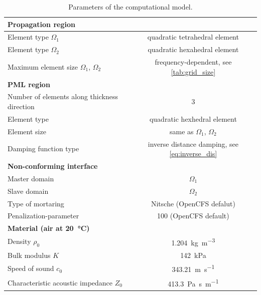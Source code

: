 {\begin{table}
	\centering
	\caption{Parameters of the computational model.}
	\label{tab:model_parameters}
	\begin{tabular}{lc}
		\toprule
		\textbf{Propagation region} & \\
        \midrule
		Element type $\Omega_1$ & quadratic tetrahedral element \\
		Element type $\Omega_2$ & quadratic hexahedral element \\
		Maximum element size $\Omega_1$, $\Omega_2$ & frequency-dependent, see \cref{tab:grid_size}\\
  \midrule
		\textbf{PML region} & \\
        \midrule
		Number of elements along thickness direction & 3 \\
		Element type & quadratic hexhedral element \\
		Element size & same as $\Omega_1$, $\Omega_2$\\
		Damping function type & inverse distance damping, see \cref{eq:inverse_dis} \\
    \midrule
		\textbf{Non-conforming interface} & \\
          \midrule
		Master domain & $\Omega_1$ \\
		Slave domain & $\Omega_2$ \\
		Type of mortaring & Nitsche (OpenCFS defalut) \\
		Penalization-parameter & 100 (OpenCFS default) \\
    \midrule
		\textbf{Material (air at \SI{20}{\degreeCelsius})} & \\
          \midrule
		Density $\rho_0$ & \SI{1.204}{\kilogram\per\cubic\meter} \\
		Bulk modulus $K$ & \SI{142}{\kilo\pascal} \\
		Speed of sound $c_0$ & \SI{343.21}{\meter\per\second} \\
		Characteristic acoustic impedance $Z_0$ & \SI{413.3}{\pascal\second\per\meter}  \\
		\bottomrule
	\end{tabular}
\end{table}

}
